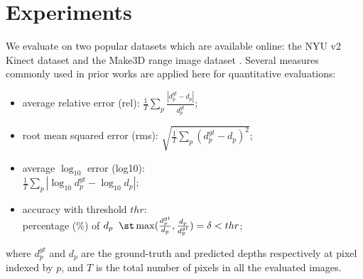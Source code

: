 \section{Experiments}


We evaluate on two popular datasets which are available online: the NYU v2 Kinect dataset \cite{nyud2_eccv12} and the Make3D range image dataset \cite{make3d_pami09}. 
Several measures commonly used in prior works are applied here for quantitative evaluations:
\begin{itemize}
\vspace{-.12cm} \item
average relative error (rel): 
$\frac{1}{T} \sum_p \frac{|d_p^{gt} - d_p|}{d_p^{gt}} $;
\vspace{-.12cm} \item
root mean squared error (rms): 
$\sqrt{\frac{1}{T} \sum_p (d_p^{gt} - d_p)^2}$;
\vspace{-.12cm} \item
average $\log_{10}$ error (log10): \\
$\frac{1}{T} \sum_p | \log_{10}d_p^{gt} - \log_{10}d_p|$;
\vspace{-.12cm} \item
accuracy with threshold $thr$: \\
percentage ($\%$) of $d_p \; \; \st \max (\frac{d_p^{gt}}{d_p}, \frac{d_p}{d_p^{gt}}) = \delta < thr$;
\end{itemize}
%
%
%
%
%
%
%
%
%
%
%
%
%
%
%
%
%
%
%
%
where $d_p^{gt}$ and $d_p$ are the ground-truth and predicted depths respectively at pixel indexed by $p$, and $T$ is the total number of pixels in all the evaluated images. 


